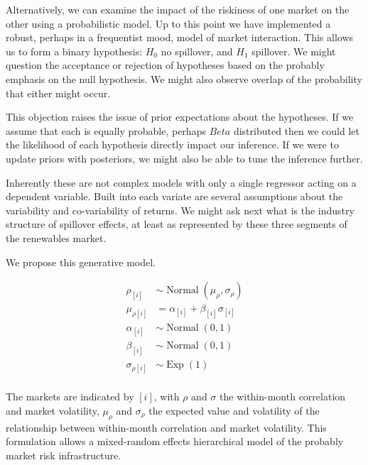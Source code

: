 \documentclass{article}
\begin{document}
Alternatively, we can examine the impact of the riskiness of one market
on the other using a probabilistic model. Up to this point we have
implemented a robust, perhaps in a frequentist mood, model of market
interaction. This allows us to form a binary hypothesis: \(H_0\) no
spillover, and \(H_1\) spillover. We might question the acceptance or
rejection of hypotheses based on the probably emphasis on the null
hypothesis. We might also observe overlap of the probability that either
might occur.

This objection raises the issue of prior expectations about the
hypotheses. If we assume that each is equally probable, perhaps \(Beta\)
distributed then we could let the likelihood of each hypothesis directly
impact our inference. If we were to update priors with posteriors, we
might also be able to tune the inference further.

Inherently these are not complex models with only a single regressor
acting on a dependent variable. Built into each variate are several
assumptions about the variability and co-variability of returns. We
might ask next what is the industry structure of spillover effects, at
least as represented by these three segments of the renewables market.

We propose this generative model.

\begin{align}
\rho_[i] & \sim \operatorname{Normal}(\mu_{\rho}, \sigma_{\rho}) \\
\mu_{\rho [i]} &= \alpha_[i] + \beta_[i] \sigma_[i] \\
\alpha_[i] & \sim \operatorname{Normal}(0,1) \\
\beta_[i] & \sim \operatorname{Normal}(0,1) \\
\sigma_{\rho [i]} & \sim \operatorname{Exp}(1) \\
\end{align}

The markets are indicated by \([i]\), with \(\rho\) and \(\sigma\) the
within-month correlation and market volatility, \(\mu_{\rho}\) and
\(\sigma_{\rho}\) the expected value and volatility of the relationship
between within-month correlation and market volatility. This formulation
allows a mixed-random effects hierarchical model of the probably market
risk infrastructure.
\end{document}
